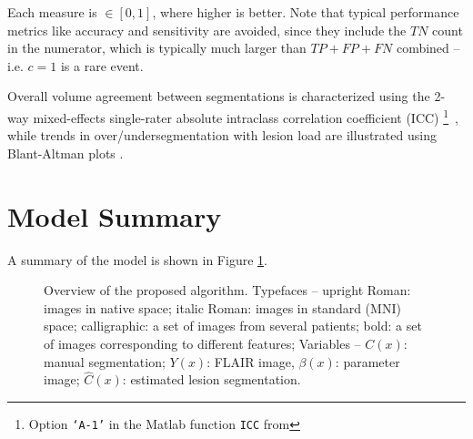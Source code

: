 Each measure is $\in [0,1]$, where higher is better.
Note that typical performance metrics like accuracy and sensitivity are avoided, since they include the $TN$ count in the numerator, which is typically much larger than $TP + FP + FN$ combined -- i.e. $c=1$ is a rare event.
\par
Overall volume agreement between segmentations is characterized using the 2-way mixed-effects single-rater absolute intraclass correlation coefficient (ICC)%
\footnote{Option \texttt{`A-1'} in the Matlab function \texttt{ICC} from }\ 
\cite{Koo2016}, while trends in over/undersegmentation with lesion load are illustrated using Blant-Altman plots \cite{Altman1983}.
\section{Model Summary}



A summary of the model is shown in Figure \ref{fig:modelsum}.
\begin{figure}
  \centering\scalebox{0.65}{}
  \caption{Overview of the proposed algorithm.
    Typefaces -- upright Roman: images in native space; italic Roman: images in standard (MNI) space; calligraphic: a set of images from several patients; bold: a set of images corresponding to different features;
    Variables -- $C(x)$: manual segmentation; $Y(x)$: FLAIR image, $\beta(x)$: parameter image; $\hat{C}(x)$: estimated lesion segmentation.}
  \label{fig:modelsum}
\end{figure}
